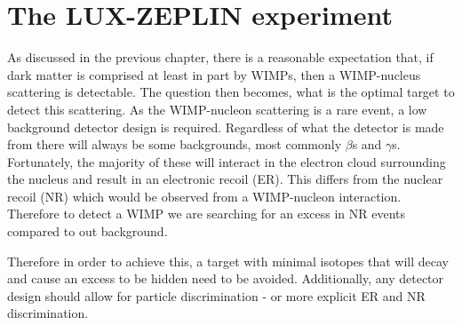 \chapter{The LUX-ZEPLIN experiment}
\label{sec:lz_detector_chapter}
\par
As discussed in the previous chapter, there is a reasonable expectation that, if dark matter is comprised at least in part by WIMPs, then a WIMP-nucleus scattering is detectable.
The question then becomes, what is the optimal target to detect this scattering.
As the WIMP-nucleon scattering is a rare event, a low background detector design is required.
Regardless of what the detector is made from there will always be some backgrounds, most commonly $\beta$s and $\gamma$s.
Fortunately, the majority of these will interact in the electron cloud surrounding the nucleus and result in an electronic recoil (ER).
This differs from the nuclear recoil (NR) which would be observed from a WIMP-nucleon interaction.
Therefore to detect a WIMP we are searching for an excess in NR events compared to out background.

\par
Therefore in order to achieve this, a target with minimal isotopes that will decay and cause an excess to be hidden need to be avoided.
Additionally, any detector design should allow for particle discrimination - or more explicit ER and NR discrimination. 





